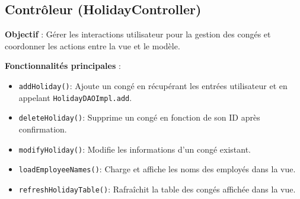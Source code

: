 \documentclass[a4paper,12pt]{article}
\begin{document}
\subsection{Contrôleur (HolidayController)}
\textbf{Objectif} : Gérer les interactions utilisateur pour la gestion des congés et coordonner les actions entre la vue et le modèle.

\textbf{Fonctionnalités principales} :
\begin{itemize}
    \item \texttt{addHoliday()}: Ajoute un congé en récupérant les entrées utilisateur et en appelant \texttt{HolidayDAOImpl.add}.
    \item \texttt{deleteHoliday()}: Supprime un congé en fonction de son ID après confirmation.
    \item \texttt{modifyHoliday()}: Modifie les informations d'un congé existant.
    \item \texttt{loadEmployeeNames()}: Charge et affiche les noms des employés dans la vue.
    \item \texttt{refreshHolidayTable()}: Rafraîchit la table des congés affichée dans la vue.
\end{itemize}
\end{document}
